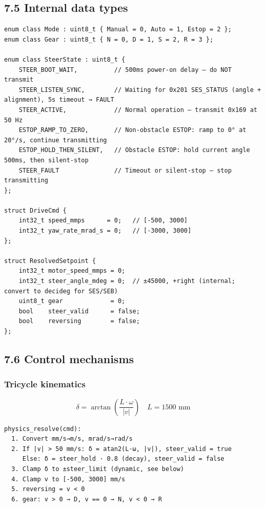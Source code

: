 \documentclass[12pt,a4paper,oneside]{report}
\begin{document}
\subsection{7.5 Internal data types}\label{internal-data-types}

\begin{verbatim}
enum class Mode : uint8_t { Manual = 0, Auto = 1, Estop = 2 };
enum class Gear : uint8_t { N = 0, D = 1, S = 2, R = 3 };

enum class SteerState : uint8_t {
    STEER_BOOT_WAIT,          // 500ms power-on delay — do NOT transmit
    STEER_LISTEN_SYNC,        // Waiting for 0x201 SES_STATUS (angle + alignment), 5s timeout → FAULT
    STEER_ACTIVE,             // Normal operation — transmit 0x169 at 50 Hz
    ESTOP_RAMP_TO_ZERO,       // Non-obstacle ESTOP: ramp to 0° at 20°/s, continue transmitting
    ESTOP_HOLD_THEN_SILENT,   // Obstacle ESTOP: hold current angle 500ms, then silent-stop
    STEER_FAULT               // Timeout or silent-stop — stop transmitting
};

struct DriveCmd {
    int32_t speed_mmps      = 0;   // [-500, 3000]
    int32_t yaw_rate_mrad_s = 0;   // [-3000, 3000]
};

struct ResolvedSetpoint {
    int32_t motor_speed_mmps = 0;
    int32_t steer_angle_mdeg = 0;  // ±45000, +right (internal; convert to decideg for SES/SEB)
    uint8_t gear             = 0;
    bool    steer_valid      = false;
    bool    reversing        = false;
};
\end{verbatim}

\subsection{7.6 Control mechanisms}\label{control-mechanisms}

\subsubsection{Tricycle kinematics}\label{tricycle-kinematics}

\[\delta = \arctan\left(\frac{L \cdot \omega}{|v|}\right) \quad L = 1500\text{ mm}\]

\begin{verbatim}
physics_resolve(cmd):
  1. Convert mm/s→m/s, mrad/s→rad/s
  2. If |v| > 50 mm/s: δ = atan2(L·ω, |v|), steer_valid = true
     Else: δ = steer_hold · 0.8 (decay), steer_valid = false
  3. Clamp δ to ±steer_limit (dynamic, see below)
  4. Clamp v to [-500, 3000] mm/s
  5. reversing = v < 0
  6. gear: v > 0 → D, v == 0 → N, v < 0 → R
\end{verbatim}
\end{document}
